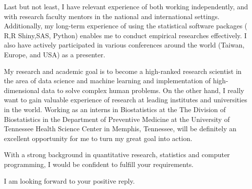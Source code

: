 \documentclass[11pt, a4paper]{awesome-cv}
\begin{document}
\begin{cvletter}
Last but not least, I have relevant experience of both working independently, and with research faculty mentors in the national and international settings. Additionally, my long-term experience of using the statistical software packages ( R,R Shiny,SAS, Python) enables me to conduct empirical researches effectively.
 I also have actively participated in various conferences around the world (Taiwan, Europe, and USA) as a presenter.





My research and academic goal is to become a high-ranked research scientist in the area of data science and machine learning and implementation of high-dimensional data to solve complex human problems. On the other hand, I really want to gain valuable experience of research at leading institutes and universities in the world. Working as an interns in Biostatistics at the The Division of Biostatistics in the Department of Preventive Medicine at the University of Tennessee Health Science Center in Memphis, Tennessee, will be definitely an excellent opportunity for me to turn my great goal into action. 

With a strong background in quantitative research, statistics and computer programming, I would be confident to fulfill your requirements.

I am looking forward to your positive reply.


\end{cvletter}

\makeletterclosing
\end{document}
